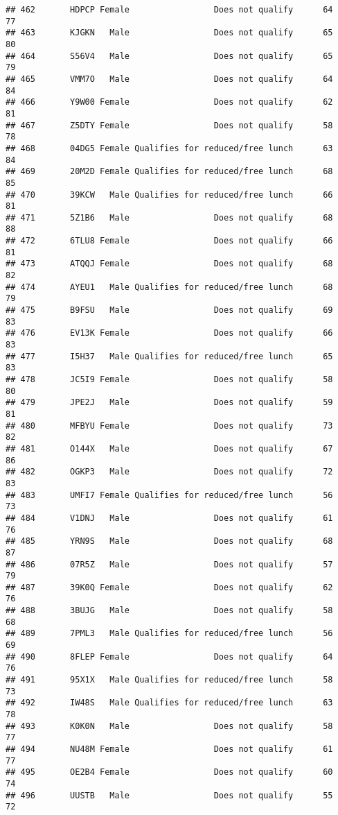 \documentclass[
]{article}
\begin{document}
\begin{verbatim}
## 462       HDPCP Female                 Does not qualify      64       77
## 463       KJGKN   Male                 Does not qualify      65       80
## 464       S56V4   Male                 Does not qualify      65       79
## 465       VMM7O   Male                 Does not qualify      64       84
## 466       Y9W00 Female                 Does not qualify      62       81
## 467       Z5DTY Female                 Does not qualify      58       78
## 468       04DG5 Female Qualifies for reduced/free lunch      63       84
## 469       20M2D Female Qualifies for reduced/free lunch      68       85
## 470       39KCW   Male Qualifies for reduced/free lunch      66       81
## 471       5Z1B6   Male                 Does not qualify      68       88
## 472       6TLU8 Female                 Does not qualify      66       81
## 473       ATQQJ Female                 Does not qualify      68       82
## 474       AYEU1   Male Qualifies for reduced/free lunch      68       79
## 475       B9FSU   Male                 Does not qualify      69       83
## 476       EV13K Female                 Does not qualify      66       83
## 477       I5H37   Male Qualifies for reduced/free lunch      65       83
## 478       JC5I9 Female                 Does not qualify      58       80
## 479       JPE2J   Male                 Does not qualify      59       81
## 480       MFBYU Female                 Does not qualify      73       82
## 481       O144X   Male                 Does not qualify      67       86
## 482       OGKP3   Male                 Does not qualify      72       83
## 483       UMFI7 Female Qualifies for reduced/free lunch      56       73
## 484       V1DNJ   Male                 Does not qualify      61       76
## 485       YRN9S   Male                 Does not qualify      68       87
## 486       07R5Z   Male                 Does not qualify      57       79
## 487       39K0Q Female                 Does not qualify      62       76
## 488       3BUJG   Male                 Does not qualify      58       68
## 489       7PML3   Male Qualifies for reduced/free lunch      56       69
## 490       8FLEP Female                 Does not qualify      64       76
## 491       95X1X   Male Qualifies for reduced/free lunch      58       73
## 492       IW48S   Male Qualifies for reduced/free lunch      63       78
## 493       K0K0N   Male                 Does not qualify      58       77
## 494       NU48M Female                 Does not qualify      61       77
## 495       OE2B4 Female                 Does not qualify      60       74
## 496       UUSTB   Male                 Does not qualify      55       72

\end{verbatim}
\end{document}
